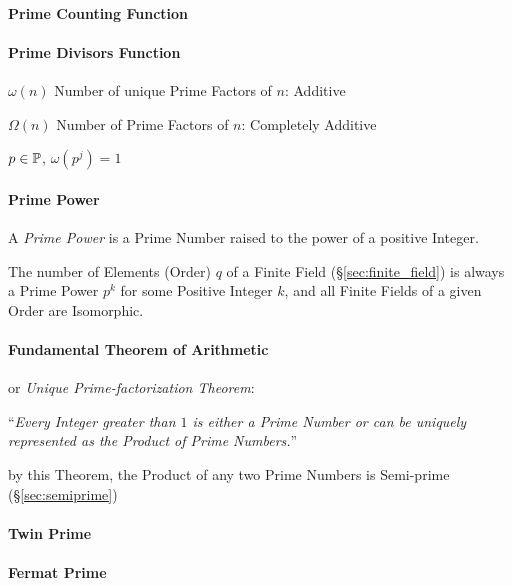 \paragraph{Prime Counting Function}\label{sec:prime_counting}\hfill

\paragraph{Prime Divisors Function}\label{sec:prime_divisors}\hfill

$\omega(n)$ Number of unique Prime Factors of $n$: Additive

$\Omega(n)$ Number of Prime Factors of $n$: Completely Additive

$p \in \mathbb{P}$, $\omega(p^j) = 1$



\paragraph{Prime Power}\label{sec:prime_power}\hfill

A \emph{Prime Power} is a Prime Number raised to the power of a
positive Integer.

The number of Elements (Order) $q$ of a Finite Field (\S\ref{sec:finite_field})
is always a Prime Power $p^k$ for some Positive Integer $k$, and all Finite
Fields of a given Order are Isomorphic.



\paragraph{Fundamental Theorem of Arithmetic}
\label{sec:fundamental_arithmetic_theorem}\hfill

or \emph{Unique Prime-factorization Theorem}:

``\emph{Every Integer greater than $1$ is either a Prime Number or can be
  uniquely represented as the Product of Prime Numbers.}''

by this Theorem, the Product of any two Prime Numbers is Semi-prime
(\S\ref{sec:semiprime})



\paragraph{Twin Prime}\label{sec:twin_prime}\hfill

\paragraph{Fermat Prime}\label{sec:fermat_prime}\hfill

